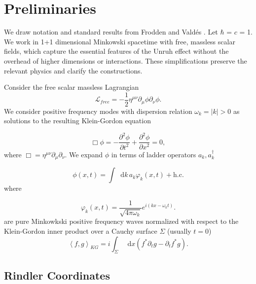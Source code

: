 \documentclass[12pt,a4paper]{article}
\newcommand*\diff{\mathop{}\!\mathrm{d}}
\begin{document}
\section{Preliminaries} \label{sec:prelim}

We draw notation and standard results from Frodden and Vald{\'{e}}s \cite{frodden2018unruh}. Let $\hbar$ = $c$ = 1. We work in 1+1 dimensional Minkowski spacetime with free, massless scalar fields, which capture the essential features of the Unruh effect without the overhead of higher dimensions or interactions. These simplifications preserve the relevant physics and clarify the constructions.

Consider the free scalar massless Lagrangian
\begin{equation}
\mathscr{L}_{free} = -\frac{1}{2} \eta^{\mu\nu}\partial_\mu \phi \partial_\nu \phi.
\end{equation}
We consider positive frequency modes with dispersion relation $\omega_k = |k| > 0$ as solutions to the resulting Klein-Gordon equation 

\begin{equation}
  \Box \phi = -\frac{\partial^2 \phi}{\partial t^2} + \frac{\partial^2 \phi}{\partial x^2} = 0,
 \label{massless-wave-eq}
\end{equation}
where $\Box = \eta^{\mu\nu} \partial_\mu \partial_\nu$. We expand $\phi$ in terms of ladder operators $a_k, a_k^\dagger$

\begin{equation}
  \phi(x,t) = \int \diff k \, a_k \varphi_k(x,t) + \text{h.c.}
\end{equation}
where

\begin{equation}
  \varphi_k(x,t) = \frac{1}{\sqrt{4\pi\omega_k}} e^{i(kx - \omega_k t)}.
\label{amode}
\end{equation}
are pure Minkowkski positive frequency waves normalized with respect to the Klein-Gordon inner product over a Cauchy surface $\Sigma$ (usually $t = 0$)
\begin{equation}
  \left<f, g\right>_{KG} = i \int_\Sigma \diff x (f^* \partial_t g - \partial_t f^* g).
\end{equation}

\subsection{Rindler Coordinates} 
\end{document}
